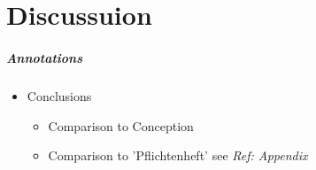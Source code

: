 \chapter{Discussuion}
\label{discussion}

\paragraph{Annotations}

\begin{itemize}
	\item Conclusions
	\begin{itemize}
		\item Comparison to Conception
		\item Comparison to 'Pflichtenheft' see \textit{Ref: Appendix}
	\end{itemize}
\end{itemize}